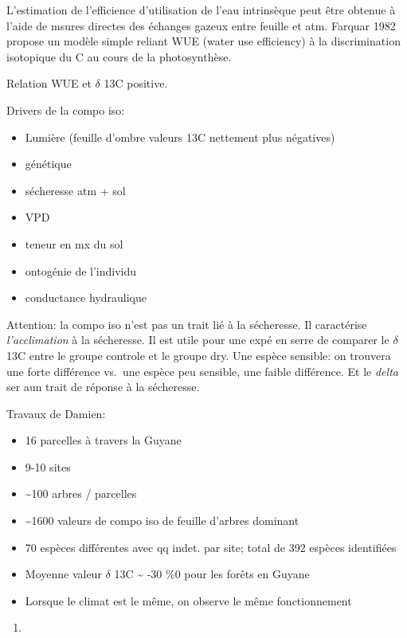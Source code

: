 \documentclass[
]{book}
\providecommand{\tightlist}{%
  \setlength{\itemsep}{0pt}\setlength{\parskip}{0pt}}
\begin{document}
L'estimation de l'efficience d'utilisation de l'eau intrinsèque peut être obtenue à l'aide de msures directes des échanges gazeux entre feuille et atm. Farquar 1982 propose un modèle simple reliant WUE (water use efficiency) à la discrimination isotopique du C au cours de la photosynthèse.

Relation WUE et \(\delta\) 13C positive.

Drivers de la compo iso:

\begin{itemize}
\tightlist
\item
  Lumière (feuille d'ombre valeurs 13C nettement plus négatives)
\item
  génétique
\item
  sécheresse atm + sol
\item
  VPD
\item
  teneur en mx du sol
\item
  ontogénie de l'individu
\item
  conductance hydraulique
\end{itemize}

Attention: la compo iso n'est pas un trait lié à la sécheresse. Il caractérise \emph{l'acclimation} à la sécheresse. Il est utile pour une expé en serre de comparer le \(\delta\) 13C entre le groupe controle et le groupe dry. Une espèce sensible: on trouvera une forte différence vs.~une espèce peu sensible, une faible différence. Et le \emph{delta} ser aun trait de réponse à la sécheresse.

Travaux de Damien:

\begin{itemize}
\tightlist
\item
  16 parcelles à travers la Guyane
\item
  9-10 sites\\
\item
  \textasciitilde100 arbres / parcelles
\item
  \textasciitilde1600 valeurs de compo iso de feuille d'arbres dominant
\item
  70 espèces différentes avec qq indet. par site; total de 392 espèces identifiées
\item
  Moyenne valeur \(\delta\) 13C \textasciitilde{} -30 \%0 pour les forêts en Guyane
\item
  Lorsque le climat est le même, on observe le même fonctionnement
\end{itemize}

\begin{enumerate}
\def\labelenumi{(\arabic{enumi})}
\setcounter{enumi}{1}
\item
\end{enumerate}
\end{document}

